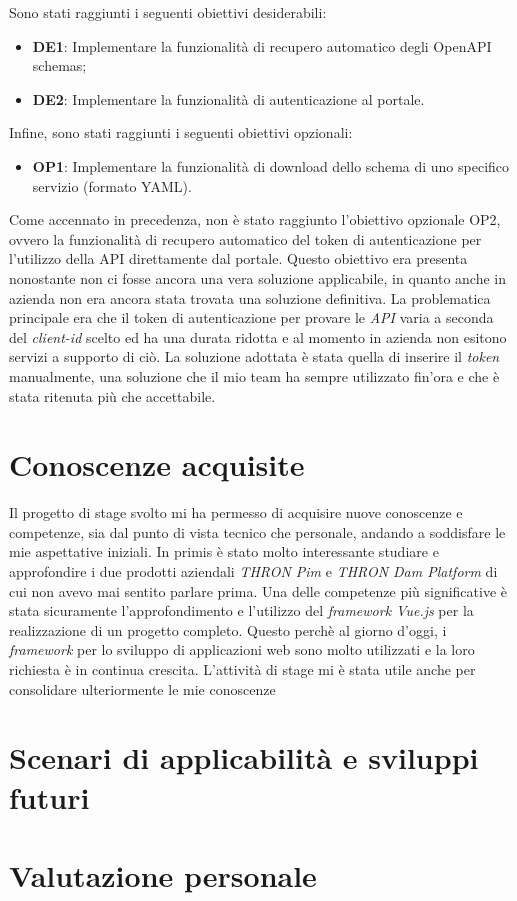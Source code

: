 Sono stati raggiunti i seguenti obiettivi desiderabili:
\begin{itemize}
  \item \textbf{DE1}:  Implementare la funzionalità di recupero automatico degli OpenAPI schemas;
  \item \textbf{DE2}: Implementare la funzionalità di autenticazione al portale.
\end{itemize}

Infine, sono stati raggiunti i seguenti obiettivi opzionali:
\begin{itemize}
  \item \textbf{OP1}: Implementare la funzionalità di download dello schema di uno specifico servizio (formato YAML).
\end{itemize}

Come accennato in precedenza, non è stato raggiunto l'obiettivo opzionale OP2, ovvero la funzionalità di recupero automatico del token di autenticazione per l'utilizzo della API direttamente dal portale.
Questo obiettivo era presenta nonostante non ci fosse ancora una vera soluzione applicabile, in quanto anche in azienda non era ancora stata trovata una soluzione definitiva.
La problematica principale era che il token di autenticazione per provare le \textit{API} varia a seconda del \textit{client-id} scelto ed ha una durata ridotta e al momento in azienda
non esitono servizi a supporto di ciò.
La soluzione adottata è stata quella di inserire il \textit{token} manualmente, una soluzione che il mio team ha sempre utilizzato fin'ora e che è stata ritenuta più che accettabile.

\section{Conoscenze acquisite}
Il progetto di stage svolto mi ha permesso di acquisire nuove conoscenze e competenze, sia dal punto di vista tecnico che personale, andando a soddisfare le mie aspettative iniziali.
In primis è stato molto interessante studiare e approfondire i due prodotti aziendali \textit{THRON Pim} e \textit{THRON Dam Platform} di cui non avevo mai sentito parlare prima.
Una delle competenze più significative è stata sicuramente l'approfondimento e l'utilizzo del \textit{framework Vue.js} per la realizzazione di un progetto completo.
Questo perchè al giorno d'oggi, i \textit{framework} per lo sviluppo di applicazioni web sono molto utilizzati e la loro richiesta è in continua crescita.
L'attività di stage mi è stata utile anche per consolidare ulteriormente le mie conoscenze


\section{Scenari di applicabilità e sviluppi futuri}

\section{Valutazione personale}
